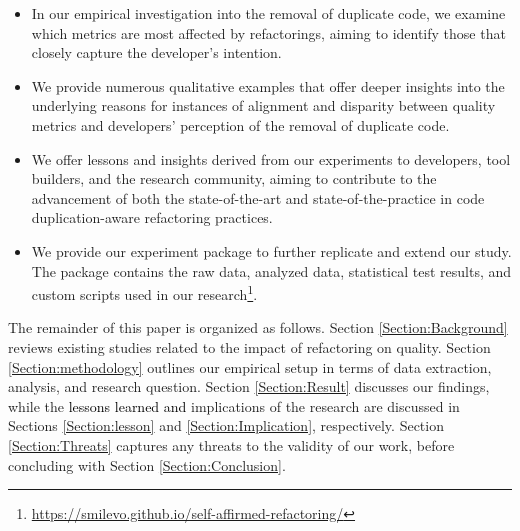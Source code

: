  \begin{itemize}
       
     \item In our empirical investigation into the removal of duplicate code, we examine which metrics are most affected by refactorings, aiming to identify those that closely capture the developer's intention. 
\item We provide numerous qualitative examples that offer deeper insights into the underlying reasons for instances of alignment and disparity between quality metrics and developers' perception of the removal of duplicate code.
\item We offer lessons and insights derived from our experiments to developers, tool builders, and the research community, aiming to contribute to the advancement of both the state-of-the-art and state-of-the-practice in code duplication-aware refactoring practices.
\item We provide our  experiment package to further replicate and extend our study. The package contains the raw data, analyzed data, statistical test results, and custom scripts used in our research\footnote{\textcolor{black}{\url{https://smilevo.github.io/self-affirmed-refactoring/}}}. %
 \end{itemize}
The remainder of this paper is organized as follows. Section \ref{Section:Background} reviews existing studies related to the impact of refactoring on quality. Section \ref{Section:methodology} outlines our empirical setup in terms of data extraction, analysis, and research question. Section \ref{Section:Result} discusses our findings, while the \textcolor{black}{lessons learned and } implications of the research are discussed in Sections \ref{Section:lesson} and \ref{Section:Implication}, respectively. Section \ref{Section:Threats} captures any threats to the validity of our work, before concluding with Section \ref{Section:Conclusion}.